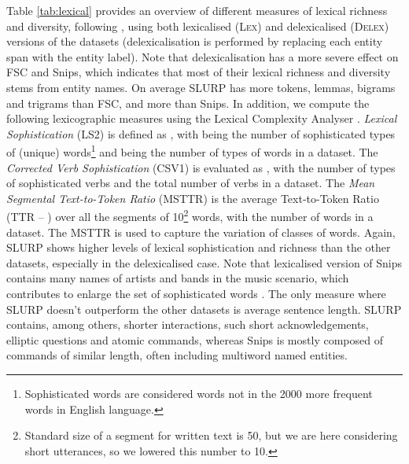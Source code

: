 \documentclass[11pt,a4paper]{article}
\newcommand{\datasetacr}{SLURP}
\begin{document}
 Table \ref{tab:lexical} provides an overview of different measures of lexical richness and diversity, following \cite{novikova-etal-2017-e2e}, using both 
lexicalised (\textsc{Lex}) and delexicalised (\textsc{Delex}) versions of the datasets (delexicalisation is performed by replacing each entity span with the entity label).  Note that delexicalisation has a more severe effect on FSC and Snips, which indicates that most of their lexical richness and diversity stems from entity names. 
On average \datasetacr{} has  more 
tokens, lemmas, bigrams and trigrams than FSC, and  more than Snips.
In addition, we compute the following
lexicographic measures using the Lexical Complexity Analyser \cite{lu2012:lex}. \textit{Lexical Sophistication} (LS2) \cite{laufer94:lex} is defined as , with  being the number of sophisticated types of (unique) words\footnote{Sophisticated words are considered words not in the 2000 more frequent words in English language.} and  being the number of types of words in a dataset. The \textit{Corrected Verb Sophistication} (CSV1) \cite{wolfe1998:second} is evaluated as , with  the number of types of sophisticated verbs and  the total number of verbs in a dataset. The \textit{Mean Segmental Text-to-Token Ratio} (MSTTR) \cite{wendell44:lex} is the average Text-to-Token Ratio (TTR -- ) over all the segments of 10\footnote{Standard size of a segment for written text is 50, but we are here considering short utterances, so we lowered this number to 10.} words, with  the number of words in a dataset. The MSTTR is used to capture the variation of classes of words. Again, \datasetacr{} shows higher levels of lexical sophistication and richness than the other datasets, especially in the delexicalised case. Note that lexicalised version of Snips contains many names of artists and bands in the music scenario, which contributes to enlarge the set of sophisticated words .
The only measure where \datasetacr{} doesn't outperform the other datasets is
average sentence length. \datasetacr{} contains, among others,  shorter interactions, such short acknowledgements, elliptic questions and atomic commands, whereas Snips is mostly composed of commands of similar length, often including multiword named entities. 
\end{document}
